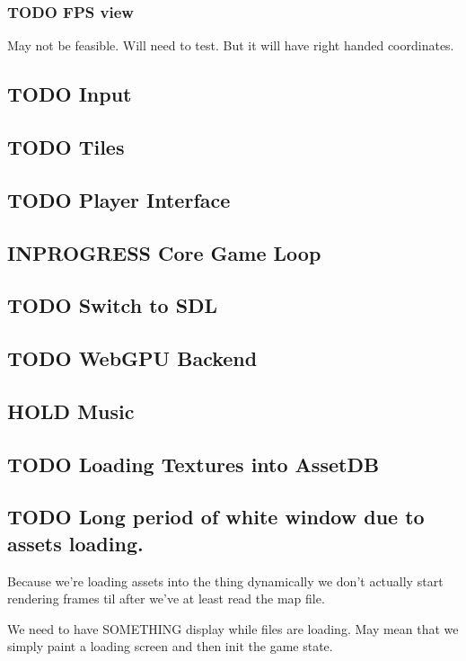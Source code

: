 \documentclass[11pt]{article}
\begin{document}
\subsubsection{{\bfseries\sffamily TODO} FPS view}
\label{sec:org09deab5}
May not be feasible. Will need to test. But it will have right handed coordinates.
\subsection{{\bfseries\sffamily TODO} Input}
\label{sec:org89d427c}
\subsection{{\bfseries\sffamily TODO} Tiles}
\label{sec:orga1e9fc7}
\subsection{{\bfseries\sffamily TODO} Player Interface}
\label{sec:org5b70db4}
\subsection{{\bfseries\sffamily INPROGRESS} Core Game Loop}
\label{sec:orgd73fb59}
\subsection{{\bfseries\sffamily TODO} Switch to SDL}
\label{sec:org71a61b2}
\subsection{{\bfseries\sffamily TODO} WebGPU Backend}
\label{sec:org6af0b96}
\subsection{{\bfseries\sffamily HOLD} Music}
\label{sec:orgd6f1e2d}
\subsection{{\bfseries\sffamily TODO} Loading Textures into AssetDB}
\label{sec:orgad069da}

\subsection{{\bfseries\sffamily TODO} Long period of white window due to assets loading.}
\label{sec:orgdda62ba}
Because we're loading assets into the thing dynamically we don't actually start rendering frames
til after we've at least read the map file.

We need to have SOMETHING display while files are loading. May mean that we simply paint a loading screen and then init the game state. 
\end{document}
